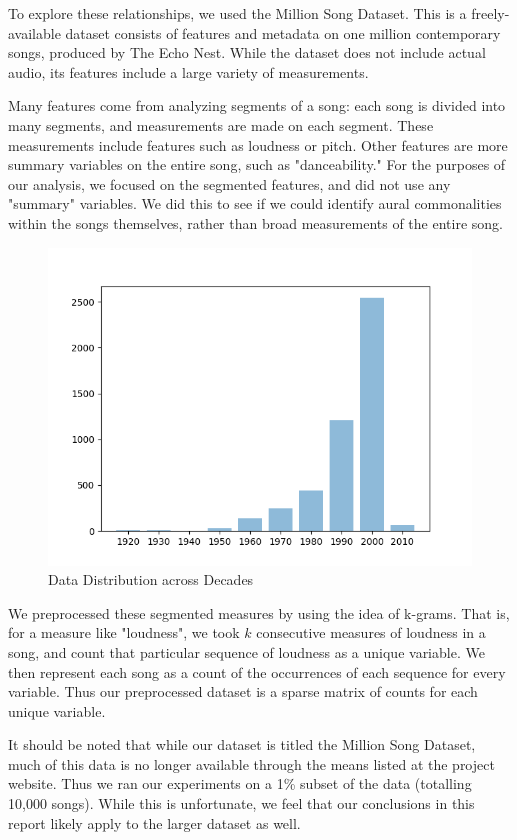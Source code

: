 To explore these relationships, we used the Million Song Dataset.
This is a freely-available dataset consists of features and metadata on one million contemporary songs,
produced by The Echo Nest.
While the dataset does not include actual audio,
its features include a large variety of measurements.

Many features come from analyzing segments of a song:
each song is divided into many segments, and measurements are made on each segment.
These measurements include features such as loudness or pitch.
Other features are more summary variables on the entire song, such as "danceability."
For the purposes of our analysis, we focused on the segmented features,
and did not use any "summary" variables.
We did this to see if we could identify aural commonalities within the songs themselves,
rather than broad measurements of the entire song.

\begin{figure}[ht]
    \centering
    \includegraphics[width=.9\textwidth]{decade_counts}
    \caption{Data Distribution across Decades}
    \label{fig:decade}
\end{figure}

We preprocessed these segmented measures by using the idea of k-grams.
That is, for a measure like "loudness", we took $k$ consecutive measures of loudness
in a song, and 
count that particular sequence of loudness as a unique variable.
We then represent each song as a count of the occurrences of each sequence for every variable.
Thus our preprocessed dataset is a sparse matrix of counts for each unique variable.

It should be noted that while our dataset is titled the Million Song Dataset,
much of this data is no longer available through the means listed at the project website.
Thus we ran our experiments on a 1\% subset of the data (totalling 10,000 songs).
While this is unfortunate, we feel that our conclusions in this report likely apply to
the larger dataset as well.
